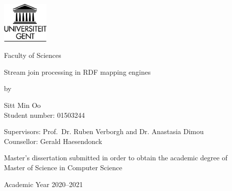 

\begin{titlepage}

    \setlength{\hoffset}{-1in}
    \setlength{\voffset}{-1in}
    \setlength{\topmargin}{1.5cm}
    \setlength{\headheight}{0.5cm}
    \setlength{\headsep}{1cm}
    \setlength{\oddsidemargin}{3cm}
    \setlength{\evensidemargin}{3cm}
    \setlength{\footskip}{1.5cm}
    \enlargethispage{1cm}

    \fontsize{12pt}{14pt}
    \selectfont

    \begin{center}

    \includegraphics[height=2cm]{fig/ruglogo.png}

    \vspace{0.5cm}

    Faculty of Sciences\\

    \vspace{3.5cm}

    \fontsize{17.28pt}{21pt}
    \selectfont

Stream join processing in RDF mapping engines

    \fontsize{12pt}{14pt}
    \selectfont

    \vspace{.6cm}

    by

    \vspace{.4cm}

Sitt Min Oo\\
Student number: 01503244\\

    \vspace{3.5cm}

Supervisors: Prof.~Dr. Ruben Verborgh and Dr. Anastasia Dimou\\
Counsellor: Gerald Haesendonck\\


    \vspace{2cm}

    Master's dissertation submitted in order to obtain the academic degree of\\
    Master of Science in Computer Science

    \vspace{1cm}

Academic Year 2020--2021

    \end{center}
    \end{titlepage}

